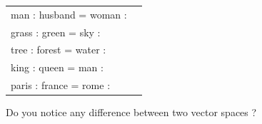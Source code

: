 \documentclass[12pt,fleqn]{article}
\begin{document}
\begin{enumerate}
\begin{itemize}
\begin{table}[htb!] 
   \begin{center} 
         \begin{tabular}{lc}
man : husband = woman :&  \\ 
grass : green = sky : & \\ 
tree : forest = water : & \\ 
king : queen = man : & \\ 
paris : france = rome : & \\
         \end{tabular}
   \end{center}
\end{table}
\end{itemize}

Do you notice any difference between two vector spaces ? 

\end{enumerate}  
\end{document}
